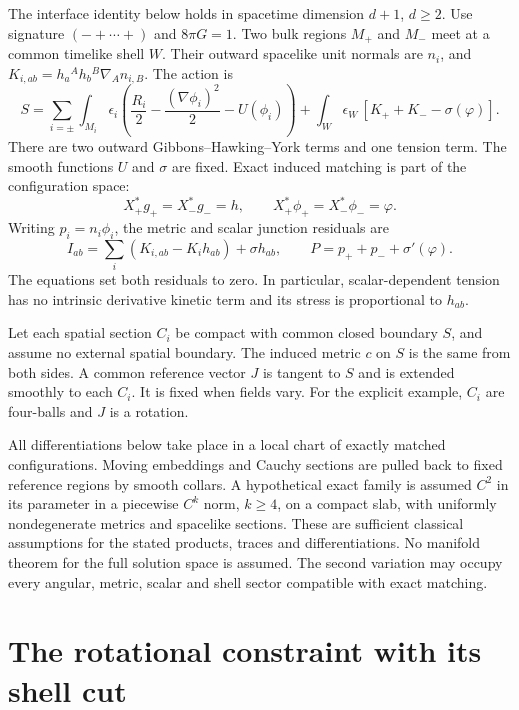 \documentclass[11pt]{article}
\theoremstyle{remark}
\begin{document}
The interface identity below holds in spacetime dimension $d+1$, $d\ge2$.
Use signature $(-+\cdots+)$ and $8\pi G=1$. Two bulk regions $M_+$ and $M_-$
meet at a common timelike shell $W$. Their outward spacelike unit normals
are $n_i$, and
$K_{i,ab}=h_a{}^A h_b{}^B\nabla_A n_{i,B}$.
The action is
\begin{equation}
 S=\sum_{i=\pm}\int_{M_i}\epsilon_i
 \left(\frac{R_i}{2}-\frac{(\nabla\phi_i)^2}{2}-U(\phi_i)\right)
 +\int_W\epsilon_W\,[K_++K_--\sigma(\varphi)].
 \label{eq:action}
\end{equation}
There are two outward Gibbons--Hawking--York terms and one tension term.
The smooth functions $U$ and $\sigma$ are fixed. Exact induced matching is
part of the configuration space:
\begin{equation}
 X_+^*g_+=X_-^*g_-=h,\qquad
 X_+^*\phi_+=X_-^*\phi_-=\varphi.
 \label{eq:matching}
\end{equation}
Writing $p_i=n_i\phi_i$, the metric and scalar junction residuals are
\begin{equation}
 I_{ab}=\sum_i(K_{i,ab}-K_i h_{ab})+\sigma h_{ab},\qquad
 P=p_++p_-+\sigma'(\varphi).
 \label{eq:junctions}
\end{equation}
The equations set both residuals to zero. In particular, scalar-dependent
tension has no intrinsic derivative kinetic term and its stress is
proportional to $h_{ab}$.

Let each spatial section $C_i$ be compact with common closed boundary $S$,
and assume no external spatial boundary. The induced metric $c$ on $S$ is
the same from both sides. A common reference vector $J$ is tangent to $S$
and is extended smoothly to each $C_i$. It is fixed when fields vary.
For the explicit example, $C_i$ are four-balls and $J$ is a rotation.

All differentiations below take place in a local chart of exactly matched
configurations. Moving embeddings and Cauchy sections are pulled back to
fixed reference regions by smooth collars. A hypothetical exact family is
assumed $C^2$ in its parameter in a piecewise $C^k$ norm, $k\ge4$, on a
compact slab, with uniformly nondegenerate metrics and spacelike sections.
These are sufficient classical assumptions for the stated products, traces
and differentiations. No manifold theorem for the full solution space is
assumed. The second variation may occupy every angular, metric, scalar and
shell sector compatible with exact matching.

\section{The rotational constraint with its shell cut}
\label{sec:constraint}
\end{document}
